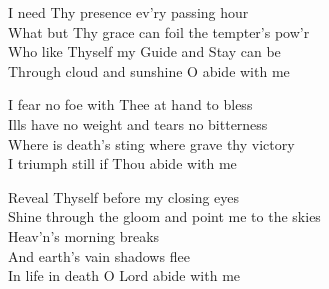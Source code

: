 \documentclass[aspectratio=169]{beamer}
\begin{document}
{\begin{frame}{}
I need Thy presence ev'ry passing hour\\ 
What but Thy grace can foil the tempter's pow'r\\ 
Who like Thyself my Guide and Stay can be\\ 
Through cloud and sunshine O abide with me

\end{frame}
\hypertarget{Abide with me[]4}{}
\begin{frame}{}
\fontsize{18.367346938775512}{22.040816326530614}\selectfont

I fear no foe with Thee at hand to bless\\ 
Ills have no weight and tears no bitterness\\ 
Where is death's sting where grave thy victory\\ 
I triumph still if Thou abide with me

\end{frame}
\hypertarget{Abide with me[]5}{}
\begin{frame}{}
\fontsize{18.367346938775512}{22.040816326530614}\selectfont

Reveal Thyself before my closing eyes\\ 
Shine through the gloom and point me to the skies\\ 
Heav'n's morning breaks\\ 
And earth's vain shadows flee\\ 
In life in death O Lord abide with me

\end{frame}
}
\end{document}
